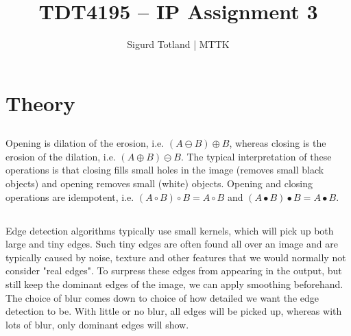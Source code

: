 \documentclass[]{article}
\title{TDT4195 – IP Assignment 3}
\author{Sigurd Totland | MTTK}
\begin{document}
\maketitle

\section{Theory}
\subsection{}
Opening is dilation of the erosion, i.e. $(A \ominus B) \oplus B$, whereas closing is the erosion of the dilation, i.e. $(A \oplus B) \ominus B$. The typical interpretation of these operations is that closing fills small holes in the image (removes small black objects) and opening removes small (white) objects. Opening and closing operations are idempotent, i.e. $(A \circ B) \circ B = A \circ B$ and $(A \bullet B) \bullet B = A \bullet B$.

\subsection{}
Edge detection algorithms typically use small kernels, which will pick up both large and tiny edges. Such tiny edges are often found all over an image and are typically caused by noise, texture and other features that we would normally not consider "real edges". To surpress these edges from appearing in the output, but still keep the dominant edges of the image, we can apply smoothing beforehand. The choice of blur comes down to choice of how detailed we want the edge detection to be. With little or no blur, all edges will be picked up, whereas with lots of blur, only dominant edges will show.
\end{document}
